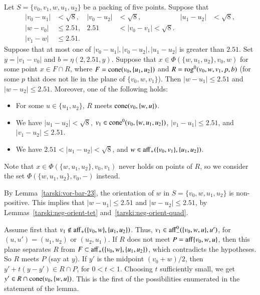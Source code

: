\begin{tarskidata}
\begin{tarski}
\begin{lemma}
 Let $S=\{v_0,v_1,w,u_1,u_2\}$ be a packing of five points.
Suppose that 
   $$
   \begin{array}{rlrlrll}
   |v_0-u_1|&<\sqrt8,& |v_0-u_2|&<\sqrt8,& |u_1-u_2|&<\sqrt8,\\
   |w-v_0|&\le 2.51, &2.51&<|v_0-v_1|<\sqrt8.\\
   |v_1-w|&\le 2.51.
   \end{array}
   $$
Suppose that at most one of $|v_0-u_1|,|v_0-u_2|,|u_1-u_2|$ is
greater than $2.51$.
%
Set $y=|v_1-v_0|$ and $b=\eta(2,2.51,y)$.
Suppose that $x\in\Phi(\{w,u_1,u_2\},v_0,w)$ for some point
$x\in F\cap R$, where $F={\operatorname{cone}}(v_0,\{u_1,u_2\})$ and
$R={\operatorname{rog}}^0(v_0,w,v_1,p,b)$ (for some $p$ that
does not lie in the plane of $\{v_0,w,v_1\}$).
Then $|w-u_1|\le 2.51$ and  $|w-u_2|\le 2.51$.
Moreover, one of the following holds:
  \begin{itemize}
  \item
  For some $u\in\{u_1,u_2\}$,
  $R$ meets ${\operatorname{cone}}(v_0,\{w,u\})$.
  \item  We have $|u_1-u_2|<\sqrt8$, 
  $v_1\in{\operatorname{cone}}^0(v_0,\{w,u_1,u_2\})$, 
  $|v_1-u_1|\le 2.51$, and $|v_1-u_2|\le 2.51$.
  \item  We have $2.51<|u_1-u_2|<\sqrt8$, and 
  $w\in{\operatorname{aff}}_+(\{v_0,v_1\},\{u_1,u_2\})$.
  \end{itemize}
\end{lemma}

\begin{proved}  
Note that $x\in\Phi(\{w,u_1,u_2\},v_0,v_1)$ never holds
on points of $R$, so we consider the set
$\Phi(\{w,u_1,u_2\},v_0,-)$ instead.

By Lemma~\ref{tarski:vor-bar-23}, the orientation
of $w$ in $S=\{v_0,w,u_1,u_2\}$ is non-positive.  This implies that
$|w-u_1|\le 2.51$ and  $|w-u_2|\le 2.51$, by
 Lemmas~\ref{tarski:neg-orient-tet} and~\ref{tarski:neg-orient-quad}. 


Assume first that 
$v_1\not\in {\operatorname{aff}}_+(\{v_0,w\},\{u_1,u_2\})$.  
Thus, $v_1\in {\operatorname{aff}}_-^0(\{v_0,w,u\},u')$, for $(u,u')=(u_1,u_2)$ or $(u_2,u_1)$.
If $R$ does not meet $P={\operatorname{aff}}\{v_0,w,u\}$, then this plane separates
$R$ from $F\subset {\operatorname{aff}}_+(\{v_0,w\},\{u_1,u_2\})$, which contradicts
the hypotheses.  So $R$ meets $P$ (say at $y$).  
If $y'$ is the midpoint $(v_0+w)/2$, then
$y' + t (y - y')\in R\cap P$, for $0<t<1$.  Choosing $t$ sufficiently
small, we get $y'\in R\cap {\operatorname{cone}}(v_0,\{w,u\})$.
This is the first of the possibilities enumerated in the statement
of the lemma.



\end{proved}
\end{tarski}
\end{tarskidata}
